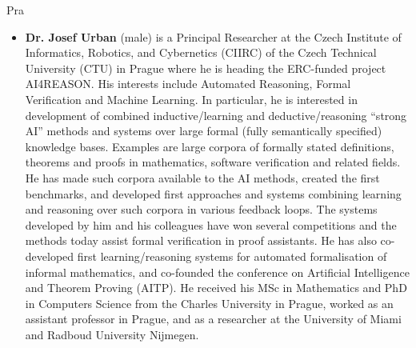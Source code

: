 \begin{sitedescription}{Pra}


\begin{itemize}
\item
\textbf{Dr. Josef Urban} (male) is a Principal Researcher at the Czech Institute of Informatics, Robotics, and Cybernetics (CIIRC) of the Czech Technical University (CTU) in Prague where he is heading the ERC-funded project
AI4REASON. His interests include Automated Reasoning, Formal Verification and Machine Learning. In particular, he is interested in development of combined inductive/learning and deductive/reasoning
``strong AI'' methods and systems over large formal (fully semantically specified) knowledge bases. Examples are large corpora of formally stated definitions, theorems and proofs in mathematics, software
verification and related fields.  He has made such corpora available to the AI methods, created the first benchmarks, and developed first approaches and systems combining learning and reasoning over such
corpora in various feedback loops.  The systems developed by him and his colleagues have won several competitions and the methods today assist formal verification in proof assistants. He has also
co-developed first learning/reasoning systems for automated formalisation of informal mathematics, and co-founded the conference on Artificial Intelligence and Theorem Proving (AITP).
He received his MSc in Mathematics and PhD in Computers Science from
the Charles University in Prague, worked as an assistant professor in
Prague, and as a researcher at the University of Miami and Radboud
University Nijmegen.




\end{itemize}
\end{sitedescription}
